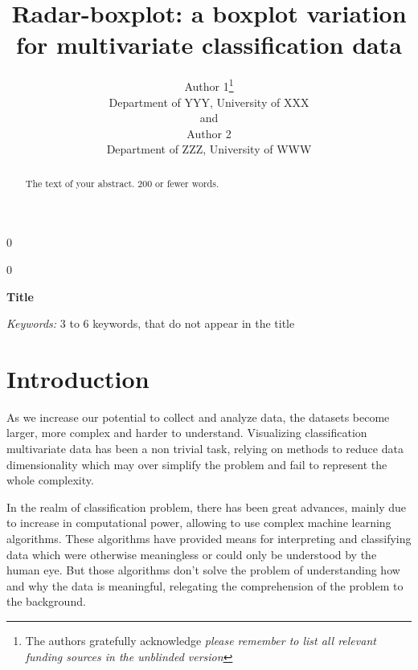 \documentclass[12pt]{article}
\newcommand{\blind}{0}
\newcommand{\thetitle}{%
Radar-boxplot: a boxplot variation for multivariate classification data%
}
\begin{document}
%

\def\spacingset#1{\renewcommand{\baselinestretch}%
{#1}\small\normalsize} \spacingset{1}



\blind
{
  \title{\bf \thetitle}
\author{Author 1\thanks{
    The authors gratefully acknowledge \textit{please remember to list all relevant funding sources in the unblinded version}}\hspace{.2cm}\\
    Department of YYY, University of XXX\\
    and \\
    Author 2 \\
    Department of ZZZ, University of WWW}
  \maketitle
} \fi
\blind
{
  \bigskip
  \bigskip
  \bigskip
  \begin{center}
    {\LARGE\bf Title}
\end{center}
  \medskip
} \fi

\bigskip
\begin{abstract}
  The text of your abstract.  200 or fewer words.
\end{abstract}
\noindent%
{\it Keywords:}  3 to 6 keywords, that do not appear in the title
\vfill

\newpage
\spacingset{1.45} %

\section{Introduction}
\label{sec:intro}
As we increase our potential to collect and analyze data, the datasets become larger, more complex and harder to understand. Visualizing classification multivariate data has been a non trivial task, relying on methods to reduce data dimensionality which may over simplify the problem and fail to represent the whole complexity. 

In the realm of classification problem, there has been great advances, mainly due to increase in computational power, allowing to use complex machine learning algorithms. These algorithms have provided means for interpreting and classifying data which were otherwise meaningless or could only be understood by the human eye. But those algorithms don't solve the problem of understanding how and why the data is meaningful, relegating the comprehension of the problem to the background. 
\end{document}
